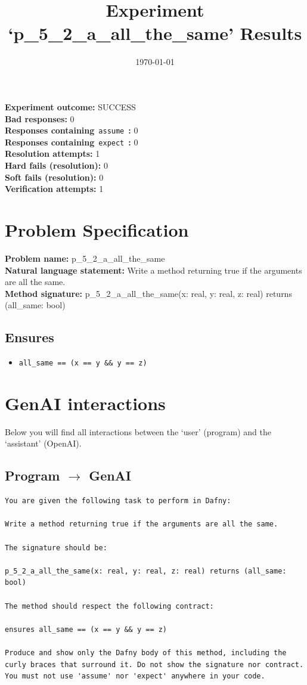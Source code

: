 \documentclass{article}
\begin{document}
\title{Experiment `p\_5\_2\_a\_all\_the\_same' Results}
\author{\today}
\date{}
\maketitle
\textbf{Experiment outcome: }SUCCESS
\\\textbf{Bad responses: }0
\\\textbf{Responses containing}~\texttt{assume}~\textbf{: }0
\\\textbf{Responses containing}~\texttt{expect}~\textbf{: }0
\\\textbf{Resolution attempts: }1
\\\textbf{Hard fails (resolution): }0
\\\textbf{Soft fails (resolution): }0
\\\textbf{Verification attempts: }1
\section*{Problem Specification}
\textbf{Problem name: }p\_5\_2\_a\_all\_the\_same
\\\textbf{Natural language statement: }Write a method returning true if the arguments are all the same.
\\\textbf{Method signature: }p\_5\_2\_a\_all\_the\_same(x: real, y: real, z: real) returns (all\_same: bool)
\subsection*{Ensures}
\begin{itemize}
\item \texttt{all\_same == (x == y \&\& y == z)}
\end{itemize}
\clearpage
\section*{GenAI interactions}
Below you will find all interactions between the `user' (program) and the `assistant' (OpenAI).
\subsection*{Program $\rightarrow$ GenAI}
\begin{lstlisting}
You are given the following task to perform in Dafny:

Write a method returning true if the arguments are all the same.

The signature should be:

p_5_2_a_all_the_same(x: real, y: real, z: real) returns (all_same: bool)

The method should respect the following contract:

ensures all_same == (x == y && y == z)

Produce and show only the Dafny body of this method, including the curly braces that surround it. Do not show the signature nor contract. You must not use 'assume' nor 'expect' anywhere in your code.
\end{lstlisting}
\end{document}
